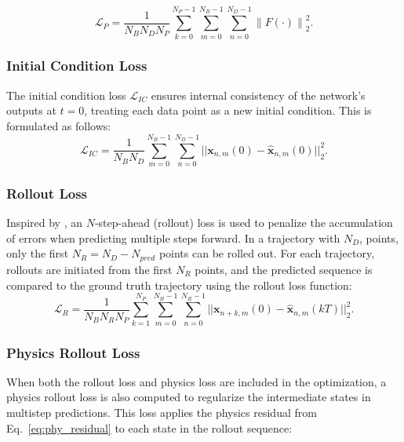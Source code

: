 \begin{equation}
\label{eq:phys_loss}
    \mathcal{L}_P = \frac{1}{N_B N_D N_P} \sum_{k=0}^{N_P - 1} \sum_{m=0}^{N_B - 1} \sum_{n=0}^{N_D - 1} \left\| F\left(\cdot\right) \right\|_2^2.
\end{equation}






\subsubsection{Initial Condition Loss}
The initial condition loss $\mathcal{L}_{IC}$ ensures internal consistency of the network’s outputs at $t=0$, treating each data point as a new initial condition. This is formulated as follows:
\begin{equation}
    \mathcal{L}_{IC} = \frac{1}{N_B N_D} \sum^{N_B-1}_{m=0}\sum^{N_D-1}_{n=0}||\mathbf{x}_{n,m}(0)-\hat{\mathbf{x}}_{n,m}(0)||_2^2.
\end{equation}

\subsubsection{Rollout Loss}
Inspired by \cite{zhao_research_2024}, an $N$-step-ahead (rollout) loss is used to penalize the accumulation of errors when predicting multiple steps forward. In a trajectory with $N_D$, points, only the first $N_R=N_D-N_{pred}$ points can be rolled out. For each trajectory, rollouts are initiated from the first $N_R$ points, and the predicted sequence is compared to the ground truth trajectory using the rollout loss function:
\begin{equation}
    \mathcal{L}_R = \frac{1}{{N_B N_R N_P}} \sum^{N_P}_{k=1} \sum^{N_B-1}_{m=0} \sum^{N_R-1}_{n=0} ||\mathbf{x}_{n+k,m}(0) - \hat{\mathbf{x}}_{n,m}(kT)||_2^2.
\end{equation}

\subsubsection{Physics Rollout Loss}
When both the rollout loss and physics loss are included in the optimization, a physics rollout loss is also computed to regularize the intermediate states in multistep predictions. This loss applies the physics residual from Eq.~\eqref{eq:phy_residual} to each state in the rollout sequence:

